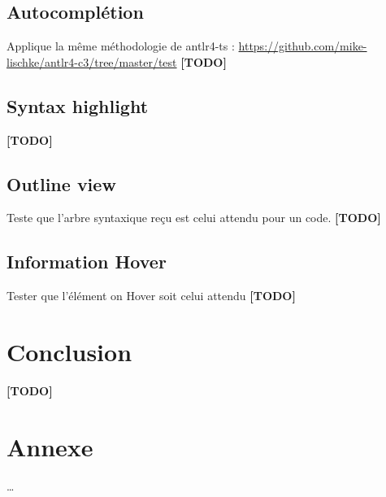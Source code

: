 \documentclass[
    iict, %
    il, %
]{heig-tb}
\begin{document}
\section{Autocomplétion}
Applique la même méthodologie de antlr4-ts : \href{https://github.com/mike-lischke/antlr4-c3/tree/master/test}{https://github.com/mike-lischke/antlr4-c3/tree/master/test}
\textbf{[TODO]}

\section{Syntax highlight}
\textbf{[TODO]}

\section{Outline view}
Teste que l'arbre syntaxique reçu est celui attendu pour un code.
\textbf{[TODO]}

\section{Information Hover}
Tester que l'élément on Hover soit celui attendu
\textbf{[TODO]}

\chapter{Conclusion}
\textbf{[TODO]}



\chapter{Annexe}
\dots


\end{document}
